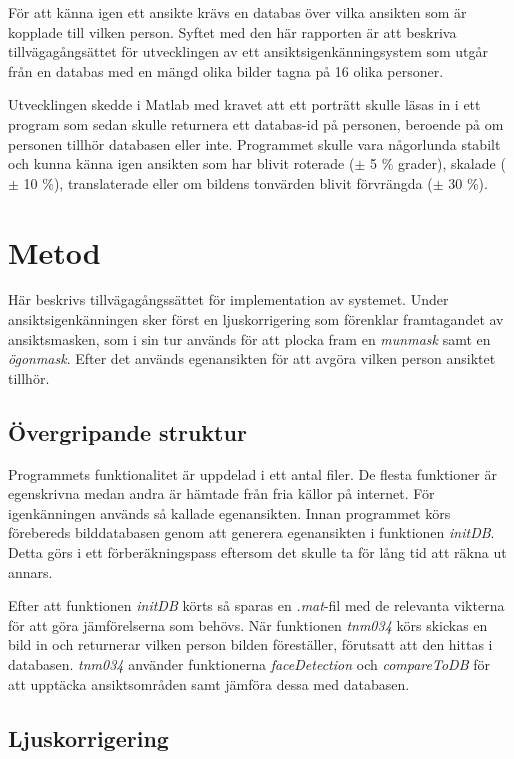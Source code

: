 \documentclass[a4paper,12pt,oneside,final]{extbook}
\begin{document}
För att känna igen ett ansikte krävs en databas över vilka ansikten som är kopplade till vilken person. Syftet med den här rapporten är att beskriva tillvägagångsättet för utvecklingen av ett ansiktsigenkänningsystem som utgår från en databas med en mängd olika bilder tagna på 16 olika personer.

Utvecklingen skedde i Matlab med kravet att ett porträtt skulle läsas in i ett program som sedan skulle returnera ett databas-id på personen, beroende på om personen tillhör databasen eller inte. Programmet skulle vara någorlunda stabilt och kunna känna igen ansikten som har blivit roterade \newline ($\pm$ 5 \% grader), skalade ($\pm$ 10 \%), translaterade eller om bildens tonvärden blivit förvrängda ($\pm$ 30 \%).

\chapter{Metod}
\label{metod}
Här beskrivs tillvägagångssättet för implementation av systemet. Under ansiktsigenkänningen sker först en ljuskorrigering som förenklar framtagandet av ansiktsmasken, som i sin tur används för att plocka fram en \textit{munmask} samt en \textit{ögonmask}. Efter det används egenansikten för att avgöra vilken person ansiktet tillhör.

\section{Övergripande struktur}

Programmets funktionalitet är uppdelad i ett antal filer. De flesta funktioner är egenskrivna medan andra är hämtade från fria källor på internet. För igenkänningen används så kallade egenansikten. Innan programmet körs förebereds bilddatabasen genom att generera egenansikten i funktionen \textit{initDB}. Detta görs i ett förberäkningspass eftersom det skulle ta för lång tid att räkna ut annars.

Efter att funktionen \textit{initDB} körts så sparas en \textit{.mat}-fil med de relevanta vikterna för att göra jämförelserna som behövs. När funktionen \textit{tnm034} körs skickas en bild in och returnerar vilken person bilden föreställer, förutsatt att den hittas i databasen. \textit{tnm034} använder funktionerna \textit{faceDetection} och \textit{compareToDB} för att upptäcka ansiktsområden samt jämföra dessa med databasen.

\section{Ljuskorrigering}
\end{document}
